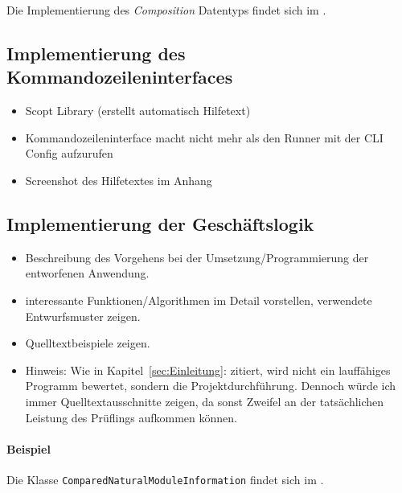 Die Implementierung des \textit{Composition} Datentyps findet sich im .

\subsection{Implementierung des Kommandozeileninterfaces}
\label{sec:ImplementierungKommandozeileninterface}

\begin{itemize}
	\item Scopt Library (erstellt automatisch Hilfetext)
	\item Kommandozeileninterface macht nicht mehr als den Runner mit der CLI Config aufzurufen
	\item Screenshot des Hilfetextes im Anhang
\end{itemize}


\subsection{Implementierung der Geschäftslogik}
\label{sec:ImplementierungGeschaeftslogik}

\begin{itemize}
	\item Beschreibung des Vorgehens bei der Umsetzung/Programmierung der entworfenen Anwendung.
	\item \Ggfs interessante Funktionen/Algorithmen im Detail vorstellen, verwendete Entwurfsmuster zeigen.
	\item Quelltextbeispiele zeigen.
	\item Hinweis: Wie in Kapitel~\ref{sec:Einleitung}:  zitiert, wird nicht ein lauffähiges Programm bewertet, sondern die Projektdurchführung. Dennoch würde ich immer Quelltextausschnitte zeigen, da sonst Zweifel an der tatsächlichen Leistung des Prüflings aufkommen können.
\end{itemize}

\paragraph{Beispiel}
Die Klasse \texttt{Com\-par\-ed\-Na\-tu\-ral\-Mo\-dule\-In\-for\-ma\-tion} findet sich im .  


